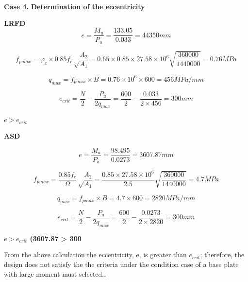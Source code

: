 {\textbf{Case 4.}
\textbf{Determination of the eccentricity}


\textbf{LRFD}
\begin{equation}
    e = \frac{M_{u}}{P_{u}} = \frac{133.05}{0.033} = 44350mm
\end{equation}


\begin{equation}
    f_{pmax} = {\varphi}_{c} \times{0}.{85}{f}_{c}\sqrt \frac{A_{2}}{A_{1}} 
= 0.65 \times{0}.{85}\times27.58\times{{10}}^{6}\sqrt{\frac{360000}{1440000}} = 0.76MPa
\end{equation}

\begin{equation}
q_{max} = f_{pmax} \times{B} = 0.76 \times 10^6\times 600 = 456MPa/mm
\end{equation}

\begin{equation}
e_{crit}= \frac{N}{2}-\frac{P_{u}}{2q_{max}}  = \frac{600}{2}-\frac{0.033}{2\times 456} = 300mm
\end{equation}


 \textbf{\(e > {e}_{{crit}}\)} 
 
\textbf{ASD}

\begin{equation}
    e = \frac{M_{a}}{P_{a}} = \frac{98.495}{0.0273}  = 3607.87mm
\end{equation}



\begin{equation}
f_{pmax} = \frac{0.85f_c}{\Omega} \sqrt\frac{A_{2}}{A_{1}} = \frac{0.85\times27.58\times10^6}{2.5}\sqrt{\frac{360000}{1440000}} = 4.7MPa
\end{equation}

\begin{equation}
q_{max} = f_{pmax} \times B = 4.7 \times600 = 2820MPa/mm
\end{equation}

\begin{equation}
 e_{crit}= \frac{{N}}{{2}}-\frac{{P}_{a}}{{{2}{q}}_{{max}}} =\frac{600}{{2}}-\frac{{0.0273}}{{2}\times2820}= 300mm
\end{equation}

 \textbf{\(e > {e}_{{crit}}\) (3607.87 > 300}
 

From the above calculation the eccentricity, e, is greater than  \({e}_{crit}\); therefore, the design does not satisfy the the criteria under the condition case of a base plate with large moment must selected..



}
